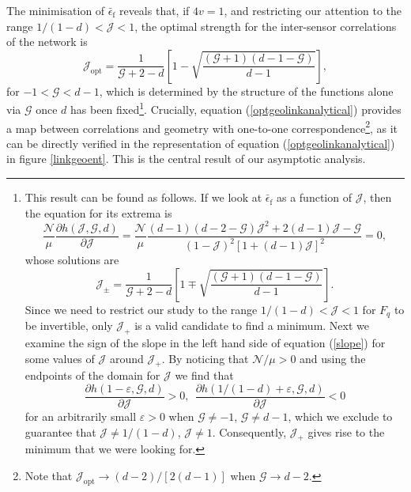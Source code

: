 The minimisation of $\bar{\epsilon}_{\mathrm{f}}$ reveals that, if $4v = 1$, and restricting our attention to the range $1/(1-d)<\mathcal{J} < 1$, the optimal strength for the inter-sensor correlations of the network is
\begin{equation}
\mathcal{J}_{\mathrm{opt}} = \frac{1}{\mathcal{G}+2-d}\left[1- \sqrt{\frac{(\mathcal{G}+1)(d-1-\mathcal{G})}{d-1}}\right],
\label{optgeolinkanalytical}
\end{equation}
for $-1 < \mathcal{G} < d-1$, which is determined by the structure of the functions alone via $\mathcal{G}$ once $d$ has been fixed\footnote{This result can be found as follows. If we look at $\bar{\epsilon}_{\mathrm{f}}$ as a function of $\mathcal{J}$, then the equation for its extrema is
\begin{equation}
\frac{\mathcal{N}}{\mu}\frac{\partial h\left(\mathcal{J}, \mathcal{G}, d\right)}{\partial \mathcal{J}} = \frac{\mathcal{N}}{\mu} \frac{(d-1)(d-2-\mathcal{G})\mathcal{J}^2+ 2(d-1)\mathcal{J} - \mathcal{G}}{(1 -\mathcal{J})^2[1+(d-1)\mathcal{J}]^2} = 0,
\nonumber
\label{slope}
\end{equation}
whose solutions are
\begin{equation}
\mathcal{J}_{\pm} = \frac{1}{\mathcal{G}+2-d}\left[1\mp \sqrt{\frac{(\mathcal{G}+1)(d-1-\mathcal{G})}{d-1}}\right].
\nonumber
\end{equation}
Since we need to restrict our study to the range $1/(1-d)<\mathcal{J} < 1$ for $F_q$ to be invertible, only $\mathcal{J_{+}}$ is a valid candidate to find a minimum. Next we examine the sign of the slope in the left hand side of equation (\ref{slope}) for some values of $\mathcal{J}$ around $\mathcal{J_{+}}$. By noticing that $\mathcal{N}/\mu > 0$ and using the endpoints of the domain for $\mathcal{J}$ we find that
\begin{equation}
\frac{\partial h\left(1 - \varepsilon, \mathcal{G}, d\right)}{\partial \mathcal{J}} > 0, ~~\frac{\partial h\left(1/(1-d) + \varepsilon, \mathcal{G}, d\right)}{\partial \mathcal{J}} < 0
\nonumber
\end{equation}
for an arbitrarily small $\varepsilon > 0$ when $\mathcal{G}\neq -1$, $\mathcal{G}\neq d-1$, which we exclude to guarantee that $\mathcal{J}\neq 1/(1-d)$, $\mathcal{J}\neq 1$. Consequently, $\mathcal{J_{+}}$ gives rise to the minimum that we were looking for.}. Crucially, equation (\ref{optgeolinkanalytical}) provides a map between correlations and geometry with one-to-one correspondence\footnote{Note that $\mathcal{J}_{\mathrm{opt}} \rightarrow (d-2)/[2(d-1)] $ when $\mathcal{G} \rightarrow d - 2$.}, as it can be directly verified in the representation of equation (\ref{optgeolinkanalytical}) in figure \ref{linkgeoent}. This is the central result of our asymptotic analysis.

